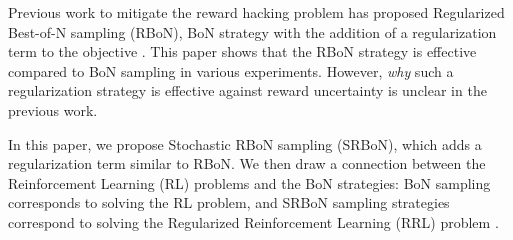 
Previous work to mitigate the reward hacking problem has proposed Regularized Best-of-N sampling (RBoN), BoN strategy with the addition of a regularization term to the objective \citep{jinnai2024regularized}.
This paper shows that the RBoN strategy is effective compared to BoN sampling in various experiments.
However, \textit{why} such a regularization strategy is effective against reward uncertainty is unclear in the previous work.

In this paper, we propose Stochastic RBoN sampling (SRBoN), which adds a regularization term similar to RBoN.
We then draw a connection between the Reinforcement Learning (RL) problems \citep{sutton2018reinforcement} and the BoN strategies: BoN sampling corresponds to solving the RL problem, and SRBoN sampling strategies correspond to solving the Regularized Reinforcement Learning (RRL) problem \citep{neu2017unified,pmlr-v97-geist19a, NEURIPS2019_3f4366ae,NEURIPS2021_bb1443cc}.

